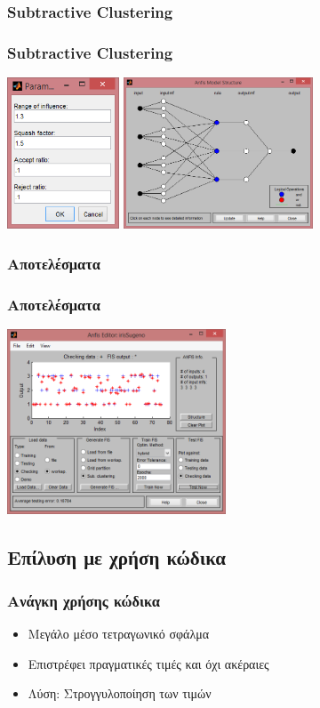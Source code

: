 \documentclass[xetex,serif,mathserif,14pt]{beamer}
\begin{document}
\subsubsection{Subtractive Clustering}
\begin{frame}
\frametitle{Subtractive Clustering}
\centering
\includegraphics[height=4.5cm]{images/subParam.png}
\includegraphics[height=4.5cm]{images/anfisModelSub.png}
\end{frame}

\subsubsection{Αποτελέσματα}
\begin{frame}
\frametitle{Αποτελέσματα}
\centering
\includegraphics[height=5.5cm]{images/ANFIS_results.png}
\end{frame}

\subsection{Επίλυση με χρήση κώδικα}
\begin{frame}
\frametitle{Ανάγκη χρήσης κώδικα}
\begin{itemize}
  \item Μεγάλο μέσο τετραγωνικό σφάλμα\pause
  \item Επιστρέφει πραγματικές τιμές και όχι ακέραιες\pause
  \item Λύση: Στρογγυλοποίηση των τιμών
\end{itemize}
\end{frame}
\end{document}
